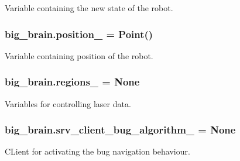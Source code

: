 Variable containing the new state of the robot. 

\subsubsection[{\texorpdfstring{position\+\_\+}{position_}}]{\setlength{\rightskip}{0pt plus 5cm}big\+\_\+brain.\+position\+\_\+ = Point()}\hypertarget{namespacebig__brain_a463bcdb8c7ed9954756492cdce9a43e2}{}\label{namespacebig__brain_a463bcdb8c7ed9954756492cdce9a43e2}


Variable containing position of the robot. 

\subsubsection[{\texorpdfstring{regions\+\_\+}{regions_}}]{\setlength{\rightskip}{0pt plus 5cm}big\+\_\+brain.\+regions\+\_\+ = None}\hypertarget{namespacebig__brain_a5f0f2fbee791fd60caa7a9dcf6ca1e00}{}\label{namespacebig__brain_a5f0f2fbee791fd60caa7a9dcf6ca1e00}


Variables for controlling laser data. 

\subsubsection[{\texorpdfstring{srv\+\_\+client\+\_\+bug\+\_\+algorithm\+\_\+}{srv_client_bug_algorithm_}}]{\setlength{\rightskip}{0pt plus 5cm}big\+\_\+brain.\+srv\+\_\+client\+\_\+bug\+\_\+algorithm\+\_\+ = None}\hypertarget{namespacebig__brain_a60d3104e99b35d213a90529c7bc5a573}{}\label{namespacebig__brain_a60d3104e99b35d213a90529c7bc5a573}


C\+Lient for activating the bug navigation behaviour. 

